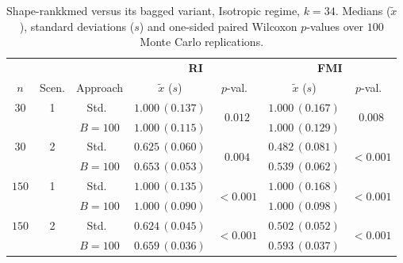 \begin{table}[h]
\centering
\caption{Shape-rankkmed versus its bagged variant, Isotropic regime, $k=34$. Medians ($\tilde x$), standard deviations ($s$) and one-sided paired Wilcoxon $p$-values over $100$ Monte Carlo replications.}
\label{tab:rkm-iso-k34}
\footnotesize
\begin{tabular}{cc c cc cc}
\toprule
& & & \multicolumn{2}{c}{\textbf{RI}} & \multicolumn{2}{c}{\textbf{FMI}} \\
\cmidrule(lr){4-5}\cmidrule(lr){6-7}
$n$ & Scen. & Approach & $\tilde x$ ($s$) & $p$-val.\ & $\tilde x$ ($s$) & $p$-val.\ \\
\midrule
$30$ & 1 & Std.\ & $1.000\,(0.137)$ & \multirow{2}{*}{$\mathbf{0.012}$} & $1.000\,(0.167)$ & \multirow{2}{*}{$\mathbf{0.008}$} \\
     &   & $B{=}100$ & $1.000\,(0.115)$ & & $1.000\,(0.129)$ & \\
$30$ & 2 & Std.\ & $0.625\,(0.060)$ & \multirow{2}{*}{$\mathbf{0.004}$} & $0.482\,(0.081)$ & \multirow{2}{*}{$\mathbf{<\!0.001}$} \\
     &   & $B{=}100$ & $0.653\,(0.053)$ & & $0.539\,(0.062)$ & \\
$150$ & 1 & Std.\ & $1.000\,(0.135)$ & \multirow{2}{*}{$\mathbf{<\!0.001}$} & $1.000\,(0.168)$ & \multirow{2}{*}{$\mathbf{<\!0.001}$} \\
     &   & $B{=}100$ & $1.000\,(0.090)$ & & $1.000\,(0.098)$ & \\
$150$ & 2 & Std.\ & $0.624\,(0.045)$ & \multirow{2}{*}{$\mathbf{<\!0.001}$} & $0.502\,(0.052)$ & \multirow{2}{*}{$\mathbf{<\!0.001}$} \\
     &   & $B{=}100$ & $0.659\,(0.036)$ & & $0.593\,(0.037)$ & \\
\bottomrule
\end{tabular}
\end{table}

